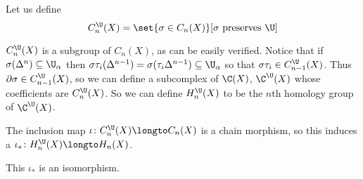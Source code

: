     Let us define
    $$ C_n^\U(X) = \set{\sigma\in C_n(X)}[\sigma\hbox{ preserves $\U$}] $$

\edefn

$C_n^\U(X)$ is a subgroup of $C_n(X)$, as can be easily verified.
Notice that if $\sigma(\Delta^n)\subseteq\U_\alpha$ then $\sigma\tau_i(\Delta^{n-1})=\sigma(\tau_i\Delta^{n-1})\subseteq\U_\alpha$ so that $\sigma\tau_i\in C_{n-1}^\U(X)$.
Thus $\partial\sigma\in C_{n-1}^\U(X)$, so we can define a subcomplex of $\C(X)$, $\C^\U(X)$ whose coefficients are $C_n^\U(X)$.
So we can define $H_n^\U(X)$ to be the $n$th homology group of $\C^\U(X)$.

The inclusion map $\iota\colon C_n^\U(X)\longto C_n(X)$ is a chain morphism, so this induces a $\iota_*\colon H_n^\U(X)\longto H_n(X)$.

\bthrm

    This $\iota_*$ is an isomorphism.

\ethrm

